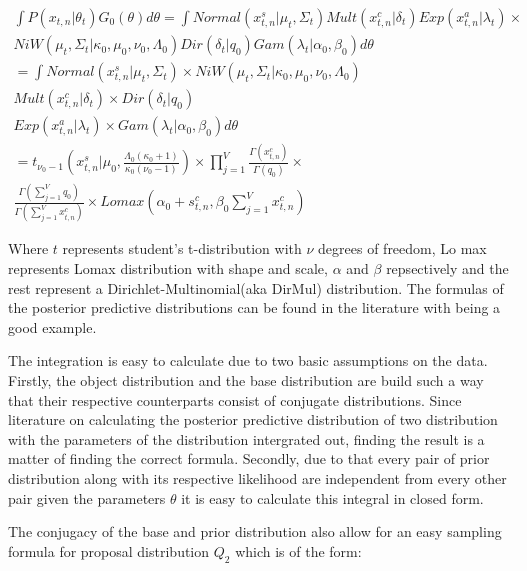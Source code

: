 \documentclass[twoside,hidelinks]{article}
\begin{document}
\begin{equation} \label{Q1}
	\begin{split}
		 	\int P(x_{t,n} | \theta_t )G_0(\theta) d\theta =
		 	\int Normal(x_{t,n}^s| \mu_t, \Sigma_t) Mult(x_{t,n}^c | \delta_t) Exp(x_{t,n}^a | \lambda_t) \times  \\ NiW( \mu_t, \Sigma_t | \kappa_0, \mu_0, \nu_0, \Lambda_0 ) Dir(\delta_t | q_0) Gam( \lambda_t | \alpha_0, \beta_0)  d\theta  \\
			= \int Normal(x_{t,n}^s| \mu_t, \Sigma_t) \times NiW( \mu_t, \Sigma_t | \kappa_0, \mu_0, \nu_0, \Lambda_0 )\\
			 Mult(x_{t,n}^c | \delta_t) \times Dir(\delta_t | q_0) \\
			 Exp(x_{t,n}^a | \lambda_t) \times Gam( \lambda_t | \alpha_0, \beta_0)  d\theta  \\
		 	= t_{\nu_0-1}( x_{t,n}^s | \mu_0, \frac{\Lambda_0(\kappa_0+1)}{\kappa_0(\nu_0-1)}) \times \prod_{j=1}^V \frac{\Gamma(x_{t,n}^c)}{\Gamma(q_0)} \times \\ \frac{\Gamma(\sum_{j=1}^V q_0)}{\Gamma(\sum_{j=1}^V x_{t,n}^c)} \times Lomax(\alpha_0 + s_{t,n}^c, \beta_0 \sum_{j=1}^V x_{t,n}^c)
 	\end{split}
\end{equation}

Where $t$ represents student's t-distribution with $\nu$ degrees of freedom, Lo
max represents Lomax distribution with shape and scale, $\alpha$ and $\beta$ repsectively and the rest represent a Dirichlet-Multinomial(aka DirMul) distribution. The formulas of the posterior predictive distributions can be found in the literature with \cite{compendium} being a good example. 

The integration is easy to calculate due to two basic assumptions on the data. Firstly, the object distribution and the base distribution are build such a way that their respective counterparts consist of conjugate distributions. Since literature on calculating the posterior predictive distribution of two distribution with the parameters of the distribution intergrated out, finding the result is a matter of finding the correct formula\cite{compendium}. Secondly, due to that every pair of prior distribution along with its respective likelihood are independent from every other pair given the parameters $\theta$ it is easy to calculate this integral in closed form.

The conjugacy of the base and prior distribution also allow for an easy sampling formula for proposal distribution $Q_2$ which is of the form: 
\end{document}
